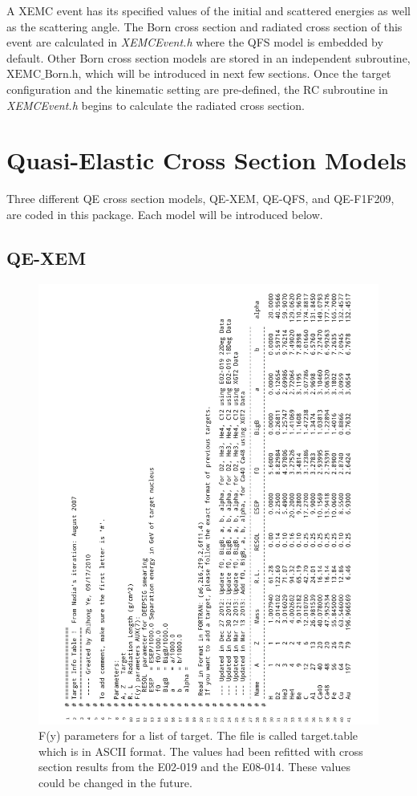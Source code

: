  A XEMC event has its specified values of the initial and scattered energies as well as the scattering angle. The Born cross section and radiated cross section of this event are calculated in \emph{XEMCEvent.h} where the QFS model is embedded by default.  Other Born cross section models are stored in an independent subroutine, \emph{$\mathrm{XEMC\_Born.h}$}, which will be introduced in next few sections. Once the target configuration and the kinematic setting are pre-defined, the RC subroutine in \emph{XEMCEvent.h} begins to calculate the radiated cross section. 

\section{Quasi-Elastic Cross Section Models}
 Three different QE cross section models, QE-XEM, QE-QFS, and QE-F1F209, are coded in this package. Each model will be introduced below.

 \subsection{QE-XEM} 
  \begin{figure}[!ht]
 \begin{center}
  \includegraphics[angle=0,width=1.0\textwidth]{./figures/xemc/target_table}
  \caption[F(y) parameters for a list of targets]{F(y) parameters for a list of target. The file is called target.table which is in ASCII format. The values had been refitted with cross section results from the E02-019 and the E08-014. These values could be changed in the future.}
  \label{xemc_tgt_table}
 \end{center}
\end{figure} 

